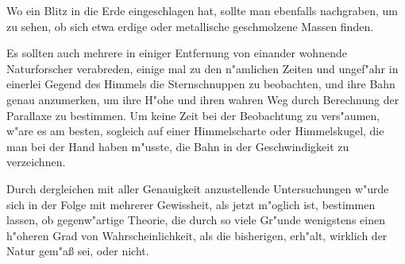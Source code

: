 \documentclass[a4paper, 11pt, oneside, polutonikogreek, german]{article}
\begin{document}
Wo ein Blitz in die Erde eingeschlagen hat, sollte man ebenfalls nachgraben, um zu sehen, ob sich etwa erdige oder metallische geschmolzene Massen finden.

Es sollten auch mehrere in einiger Entfernung von einander wohnende Naturforscher verabreden, einige mal zu den n"amlichen Zeiten und ungef"ahr in einerlei Gegend des Himmels die Sternschnuppen zu beobachten, und ihre Bahn genau anzumerken, um ihre H"ohe und ihren wahren Weg durch Berechnung der Parallaxe zu bestimmen. Um keine Zeit bei der Beobachtung zu vers"aumen, w"are es am besten, sogleich auf einer Himmelscharte oder Himmelskugel, die man bei der Hand haben m"usste, die Bahn in der Geschwindigkeit zu verzeichnen.

Durch dergleichen mit aller Genauigkeit anzustellende Untersuchungen w"urde sich in der Folge mit mehrerer Gewissheit, als jetzt m"oglich ist, bestimmen lassen, ob gegenw"artige Theorie, die durch so viele Gr"unde wenigstens einen h"oheren Grad von Wahrscheinlichkeit, als die bisherigen, erh"alt, wirklich der Natur gem"aß sei, oder nicht.
\clearpage
\end{document}

